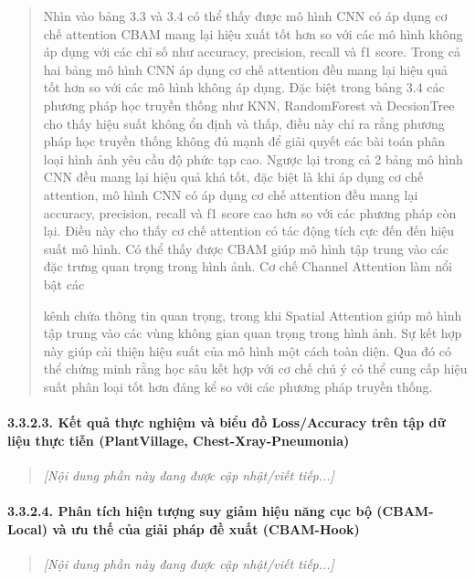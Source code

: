 \documentclass[
]{article}
\begin{document}
\begin{quote}
Nhìn vào bảng 3.3 và 3.4 có thể thấy được mô hình CNN có áp dụng cơ chế
attention CBAM mang lại hiệu xuất tốt hơn so với các mô hình không áp
dụng với các chỉ số như accuracy, precision, recall và f1 score. Trong
cả hai bảng mô hình CNN áp dụng cơ chế attention đều mang lại hiệu quả
tốt hơn so với các mô hình không áp dụng. Đặc biệt trong bảng 3.4 các
phương pháp học truyền thống như KNN, RandomForest và DecsionTree cho
thấy hiệu suất không ổn định và thấp, điều này chỉ ra rằng phương pháp
học truyền thống không đủ mạnh để giải quyết các bài toán phân loại hình
ảnh yêu cầu độ phức tạp cao. Ngược lại trong cả 2 bảng mô hình CNN đều
mang lại hiệu quả khá tốt, đặc biệt là khi áp dụng cơ chế attention, mô
hình CNN có áp dụng cơ chế attention đều mang lại accuracy, precision,
recall và f1 score cao hơn so với các phương pháp còn lại. Điều này cho
thấy cơ chế attention có tác động tích cực đến đến hiệu suất mô hình. Có
thể thấy được CBAM giúp mô hình tập trung vào các đặc trưng quan trọng
trong hình ảnh. Cơ chế Channel Attention làm nổi bật các

kênh chứa thông tin quan trọng, trong khi Spatial Attention giúp mô hình
tập trung vào các vùng không gian quan trọng trong hình ảnh. Sự kết hợp
này giúp cải thiện hiệu suất của mô hình một cách toàn diện. Qua đó có
thể chứng minh rằng học sâu kết hợp với cơ chế chú ý có thể cung cấp
hiệu suất phân loại tốt hơn đáng kể so với các phương pháp truyền thống.
\end{quote}

\paragraph{3.3.2.3. Kết quả thực nghiệm và biểu đồ Loss/Accuracy trên tập dữ liệu thực tiễn (PlantVillage, Chest-Xray-Pneumonia)}\label{3-3-2-3-practical-results}
\begin{quote}
\emph{[Nội dung phần này đang được cập nhật/viết tiếp...]}
\end{quote}

\paragraph{3.3.2.4. Phân tích hiện tượng suy giảm hiệu năng cục bộ (CBAM-Local) và ưu thế của giải pháp đề xuất (CBAM-Hook)}\label{3-3-2-4-performance-drop}
\begin{quote}
\emph{[Nội dung phần này đang được cập nhật/viết tiếp...]}
\end{quote}
\end{document}

